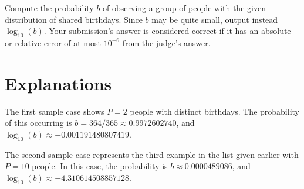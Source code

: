 Compute the probability $b$ of observing a group of people with the given distribution of
shared birthdays. Since $b$ may be quite small, output instead $\log_{10}(b)$.
Your submission's answer is considered correct if it has an absolute or
relative error of at most $10^{-6}$ from the judge's answer.

\section*{Explanations}

The first sample case shows $P=2$ people with distinct birthdays. The
probability of this occurring is $b = 364/365 \approx 0.9972602740$,
and $\log_{10}(b) \approx -0.001191480807419$.

The second sample case represents the third example in the list given earlier
with $P=10$ people. In this case, the probability is $b \approx 0.0000489086$,
and $\log_{10}(b) \approx -4.310614508857128$.
